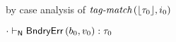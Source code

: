 {\begin{lamportproof*}
    \begin{pfproof}
      \qedstep
        \begin{pfproof}
          by case analysis of $\textit{tag-match}\,(\lfloor \tau_0 \rfloor,i_0)$
        \end{pfproof}
    \end{pfproof}

    \begin{pfproof}
      \qedstep
        \begin{pfproof}
          ${\cdot} \vdash_{\mathsf{N}} \mathsf{BndryErr}\,(b_0, v_0) : \tau_0$
        \end{pfproof}
    \end{pfproof}

\end{lamportproof*}}

